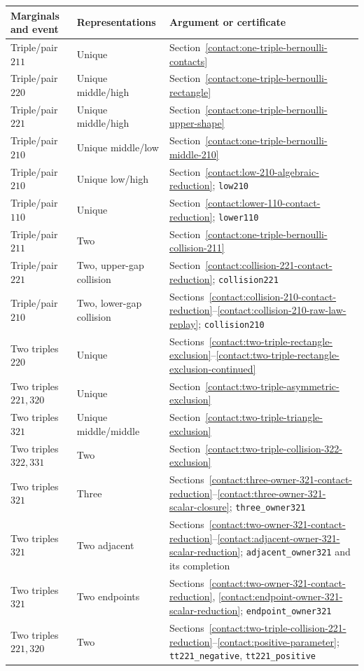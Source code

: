{\small
\begin{longtable}{>{\raggedright\arraybackslash}p{.19\linewidth}>{\raggedright\arraybackslash}p{.25\linewidth}>{\raggedright\arraybackslash}p{.45\linewidth}}
\toprule
Marginals and event & Representations & Argument or certificate \\
\midrule
\endhead
Triple/pair $211$ & Unique &
Section~\ref{contact:one-triple-bernoulli-contacts} \\
Triple/pair $220$ & Unique middle/high &
Section~\ref{contact:one-triple-bernoulli-rectangle} \\
Triple/pair $221$ & Unique middle/high &
Section~\ref{contact:one-triple-bernoulli-upper-shape} \\
Triple/pair $210$ & Unique middle/low &
Section~\ref{contact:one-triple-bernoulli-middle-210} \\
Triple/pair $210$ & Unique low/high &
Section~\ref{contact:low-210-algebraic-reduction}; \texttt{low210} \\
Triple/pair $110$ & Unique &
Section~\ref{contact:lower-110-contact-reduction}; \texttt{lower110} \\
Triple/pair $211$ & Two &
Section~\ref{contact:one-triple-bernoulli-collision-211} \\
Triple/pair $221$ & Two, upper-gap collision &
Section~\ref{contact:collision-221-contact-reduction}; \texttt{collision221} \\
Triple/pair $210$ & Two, lower-gap collision &
Sections~\ref{contact:collision-210-contact-reduction}--\ref{contact:collision-210-raw-law-replay}; \texttt{collision210} \\
Two triples $220$ & Unique &
Sections~\ref{contact:two-triple-rectangle-exclusion}--\ref{contact:two-triple-rectangle-exclusion-continued} \\
Two triples $221,320$ & Unique &
Section~\ref{contact:two-triple-asymmetric-exclusion} \\
Two triples $321$ & Unique middle/middle &
Section~\ref{contact:two-triple-triangle-exclusion} \\
Two triples $322,331$ & Two &
Section~\ref{contact:two-triple-collision-322-exclusion} \\
Two triples $321$ & Three &
Sections~\ref{contact:three-owner-321-contact-reduction}--\ref{contact:three-owner-321-scalar-closure}; \texttt{three\_owner321} \\
Two triples $321$ & Two adjacent &
Sections~\ref{contact:two-owner-321-contact-reduction}--\ref{contact:adjacent-owner-321-scalar-reduction}; \texttt{adjacent\_owner321} and its completion \\
Two triples $321$ & Two endpoints &
Sections~\ref{contact:two-owner-321-contact-reduction}, \ref{contact:endpoint-owner-321-scalar-reduction}; \texttt{endpoint\_owner321} \\
Two triples $221,320$ & Two &
Sections~\ref{contact:two-triple-collision-221-reduction}--\ref{contact:positive-parameter}; \texttt{tt221\_negative}, \texttt{tt221\_positive} \\
\bottomrule
\end{longtable}
}


